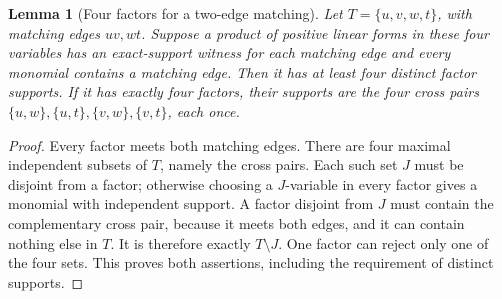 \documentclass[11pt]{article}
\newtheorem{lemma}[theorem]{Lemma}
\theoremstyle{definition}
\theoremstyle{remark}
\begin{document}
\begin{lemma}[Four factors for a two-edge matching]\label{lem:fourfactors}
Let $T=\{u,v,w,t\}$, with matching edges $uv,wt$. Suppose a product of positive linear forms in these four variables has an exact-support witness for each matching edge and every monomial contains a matching edge. Then it has at least four distinct factor supports. If it has exactly four factors, their supports are the four cross pairs $\{u,w\},\{u,t\},\{v,w\},\{v,t\}$, each once.
\end{lemma}
\begin{proof}
Every factor meets both matching edges. There are four maximal independent subsets of $T$, namely the cross pairs. Each such set $J$ must be disjoint from a factor; otherwise choosing a $J$-variable in every factor gives a monomial with independent support. A factor disjoint from $J$ must contain the complementary cross pair, because it meets both edges, and it can contain nothing else in $T$. It is therefore exactly $T\setminus J$. One factor can reject only one of the four sets. This proves both assertions, including the requirement of distinct supports.
\end{proof}
\end{document}
